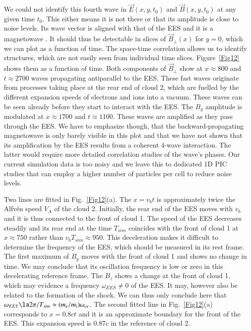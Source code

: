 \documentclass[structabstract]{aa}
\begin{document}
We could not identify this fourth wave in $\vec{E}(x,y,t_0)$ and 
$\vec{B}(x,y,t_0)$ at any given time $t_0$. This either means it is not
there or that its amplitude is close to noise levels. Its wave vector is 
aligned with that of the EES and it is a magnetowave \citep{Instability}. 
It should thus be detectable in slices of $\vec{B}_\perp (x)$ for $y=0$, 
which we can plot as a function of time. The space-time correlation allows 
us to identify structures, which are not easily seen from individual time 
slices. Figure~\ref{Fig12} shows them as a function of time. 
Both components of $\vec{B}_\perp$ show at $x\approx 800$ and $t\approx 2700$ 
waves propagating antiparallel to the EES. These fast waves originate from 
processes taking place at the rear end of cloud 2, which are fuelled by the 
different expansion speeds of electrons and ions into a vacuum. These
waves can be seen already before they start to interact with the EES.
The $B_y$ amplitude is modulated at $x\approx 1700$ and $t\approx 1100$. 
These waves are amplified as they pass through the EES. We have to emphasize 
though, that the backward-propagating magnetowave is only barely visible in 
this plot and that we have not shown that its amplification by the EES 
results from a coherent 4-wave interaction. The latter would require more 
detailed correlation studies of the wave's phases. Our current simulation
data is too noisy and we leave this to dedicated 1D PIC studies that can
employ a higher number of particles per cell to reduce noise levels.

Two lines are fitted in Fig.~\ref{Fig12}(a). The $x=v_b t$ is approximately 
twice the Alfv\'en speed $V_A$ of the cloud 2. Initially, the rear end of the 
EES moves with $v_b$ and it is thus connected to the front of cloud 1. The 
speed of the EES decreases steadily and its rear end at the time $T_{sim}$ 
coincides with the front of cloud 1 at $x\approx 750$ rather than $v_b T_{sim} 
\approx 950$. This deceleration makes it difficult to determine the frequency 
of the EES, which should be measured in its rest frame. The first maximum of 
$B_y$ moves with the front of cloud 1 and shows no change in time. We may 
conclude that its oscillation frequency is low or zero in this decelerating 
reference frame. The $B_z$ shows a change at the front of cloud 1, which may 
evidence a frequency $\omega_{EES} \neq 0$ of the EES. It may, however also 
be related to the formation of the shock. We can thus only conclude here that 
$\omega_{EES} \la 2\pi / T_{sim} \approx (m_e/m_i)\omega_{ce}$. The second 
fitted line in Fig.~\ref{Fig12}(a) corresponds to $x = 0.8ct$ and it is an 
approximate boundary for the front of the EES. This expansion speed is 
$0.87c$ in the reference of cloud 2.
\end{document}
